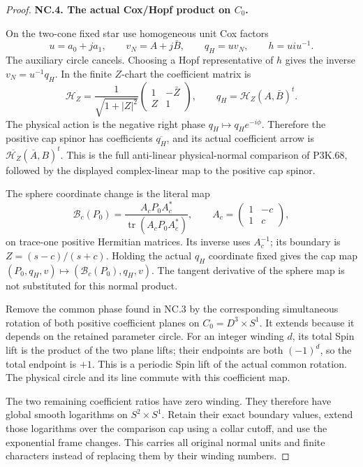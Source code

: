 \begin{proof}
\par\medskip\noindent\textbf{NC.4. The actual Cox/Hopf product on \(C_0\).}\par\nopagebreak[4]

On the two-cone fixed star use homogeneous unit Cox factors
\[
 u=a_0+ja_1,\qquad v_N=A+j\bar B,\qquad q_H=u v_N,
 \qquad h=u i u^{-1}.
\]
The auxiliary circle cancels. Choosing a Hopf representative of \(h\) gives the inverse \(v_N=u^{-1}q_H\). In the finite \(Z\)-chart the coefficient matrix is
\[
 \mathcal H_Z=\frac1{\sqrt{1+|Z|^2}}
 \begin{pmatrix}1&-\bar Z\\ Z&1\end{pmatrix},
 \qquad q_H=\mathcal H_Z(A,\bar B)^t .
\]
The physical action is the negative right phase
\(q_H\mapsto q_H e^{-i\phi}\). Therefore the positive cap spinor has coefficients \(\overline{q_H}\), and its actual coefficient arrow is
\(\overline{\mathcal H_Z}(\bar A,B)^t\). This is the full anti-linear physical-normal comparison of P3K.68, followed by the displayed complex-linear map to the positive cap spinor.

The sphere coordinate change is the literal map
\[
 \mathcal B_c(P_0)=
 \frac{A_cP_0A_c^*}{\operatorname{tr}(A_cP_0A_c^*)},
 \qquad A_c=\begin{pmatrix}1&-c\\1&c\end{pmatrix},
\]
on trace-one positive Hermitian matrices. Its inverse uses \(A_c^{-1}\); its boundary is \(Z=(s-c)/(s+c)\). Holding the actual \(q_H\) coordinate fixed gives the cap map
\((P_0,q_H,v)\mapsto(\mathcal B_c(P_0),q_H,v)\).
The tangent derivative of the sphere map is not substituted for this normal product.

Remove the common phase found in NC.3 by the corresponding simultaneous rotation of both positive coefficient planes on \(C_0=D^3\times S^1\). It extends because it depends on the retained parameter circle. For an integer winding \(d\), its total Spin lift is the product of the two plane lifts; their endpoints are both \((-1)^d\), so the total endpoint is \(+1\). This is a periodic Spin lift of the actual common rotation. The physical circle and its line commute with this coefficient map.

The two remaining coefficient ratios have zero winding. They therefore have global smooth logarithms on \(S^2\times S^1\). Retain their exact boundary values, extend those logarithms over the comparison cap using a collar cutoff, and use the exponential frame changes. This carries all original normal units and finite characters instead of replacing them by their winding numbers.


\end{proof}
